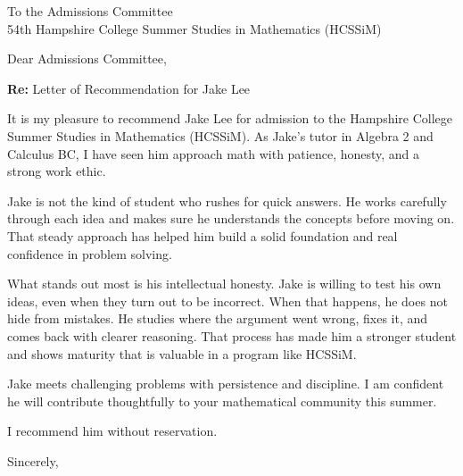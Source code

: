 \begin{letter}{To the Admissions Committee \\ 54th Hampshire College Summer Studies in Mathematics (HCSSiM)}

\opening{Dear Admissions Committee,}

\textbf{Re:} Letter of Recommendation for Jake Lee

It is my pleasure to recommend Jake Lee for admission to the Hampshire College Summer Studies in Mathematics (HCSSiM).
As Jake's tutor in Algebra 2 and Calculus BC, I have seen him approach math with patience, honesty,
and a strong work ethic.

Jake is not the kind of student who rushes for quick answers. He works carefully through each idea
and makes sure he understands the concepts before moving on. That steady approach has helped him build
a solid foundation and real confidence in problem solving.

What stands out most is his intellectual honesty. Jake is willing to test his own ideas, even when they
turn out to be incorrect. When that happens, he does not hide from mistakes. He studies where the argument
went wrong, fixes it, and comes back with clearer reasoning. That process has made him a stronger student
and shows maturity that is valuable in a program like HCSSiM.

Jake meets challenging problems with persistence and discipline. I am confident he will contribute
thoughtfully to your mathematical community this summer.

I recommend him without reservation.

\closing{Sincerely,}

\end{letter}